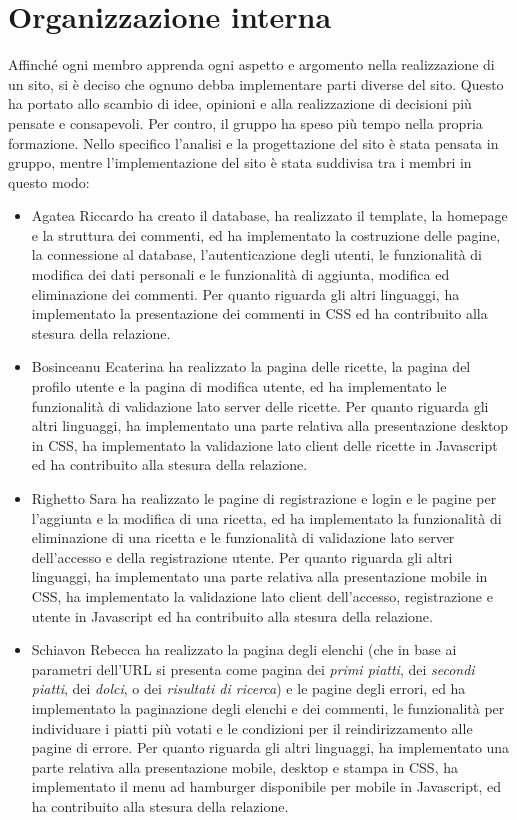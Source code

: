 \section{Organizzazione interna}
Affinché ogni membro apprenda ogni aspetto e argomento nella realizzazione di un sito, si è deciso che ognuno debba implementare parti diverse del sito. Questo ha portato allo scambio di idee, opinioni e alla realizzazione di decisioni più pensate e consapevoli. Per contro, il gruppo ha speso più tempo nella propria formazione.\newline
Nello specifico l'analisi e la progettazione del sito è stata pensata in gruppo, mentre l'implementazione del sito è stata suddivisa tra i membri in questo modo:
\begin{itemize}
	\item Agatea Riccardo ha creato il database, ha realizzato il template, la homepage e la struttura dei commenti, ed ha implementato la costruzione delle pagine, la connessione al database, l'autenticazione degli utenti, le funzionalità di modifica dei dati personali e le funzionalità di aggiunta, modifica ed eliminazione dei commenti. Per quanto riguarda gli altri linguaggi, ha implementato la presentazione dei commenti in CSS ed ha contribuito alla stesura della relazione.
	\item Bosinceanu Ecaterina ha realizzato la pagina delle ricette, la pagina del profilo utente e la pagina di modifica utente, ed ha implementato le funzionalità di validazione lato server delle ricette. Per quanto riguarda gli altri linguaggi, ha implementato una parte relativa alla presentazione desktop in CSS, ha implementato la validazione lato client delle ricette in Javascript ed ha contribuito alla stesura della relazione.
	\item Righetto Sara ha realizzato le pagine di registrazione e login e le pagine per l'aggiunta e la modifica di una ricetta, ed ha implementato la funzionalità di eliminazione di una ricetta e le funzionalità di validazione lato server dell'accesso e della registrazione utente. Per quanto riguarda gli altri linguaggi, ha implementato una parte relativa alla presentazione mobile in CSS, ha implementato la validazione lato client dell'accesso, registrazione e utente in Javascript ed ha contribuito alla stesura della relazione.
	\item Schiavon Rebecca ha realizzato la pagina degli elenchi (che in base ai parametri dell'URL si presenta come pagina dei \textit{primi piatti}, dei \textit{secondi piatti}, dei \textit{dolci}, o dei \textit{risultati di ricerca}) e le pagine degli errori, ed ha implementato la paginazione degli elenchi e dei commenti, le funzionalità per individuare i piatti più votati e le condizioni per il reindirizzamento alle pagine di errore. Per quanto riguarda gli altri linguaggi, ha implementato una parte relativa alla presentazione mobile, desktop e stampa in CSS, ha implementato il menu ad hamburger disponibile per mobile in Javascript, ed ha contribuito alla stesura della relazione.
\end{itemize}
